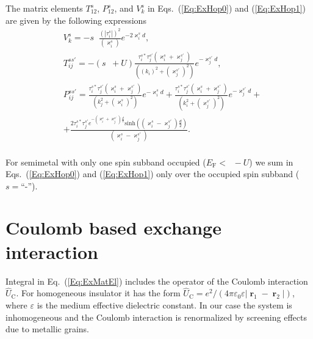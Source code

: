 \documentclass[aps,prb,amsmath,amssymb,twocolumn,superscriptaddress,showpacs,floatfix]{revtex4-1}
\DeclareMathOperator{\Ji}{\mathit J_{\mathrm{sd}}}
\DeclareMathOperator{\rv}{\mathbf r}
\begin{document}
The matrix elements $T^s_{12}$, $P^s_{12}$, and $V^s_{k}$ in Eqs.~(\ref{Eq:ExHop0}) and (\ref{Eq:ExHop1}) are given by the following expressions
\begin{equation}\label{Eq:ME7}
\begin{split}
&V^s_{k}=- s\!\Ji\frac{(|\tau^s_{i}|)^2}{(\varkappa_i^s)}e^{-2\varkappa_i^s d},\\
&T^{ss'}_{ij}\!=-(s\!\Ji+U)\frac{\tau^{s*}_{i}\tau^{s'}_{j}(\varkappa_i^{s}\!\!+\varkappa_j^{s'})}{(\!(k_i)^2+\!(\varkappa_j^{s'})^2)}e^{-\varkappa_j^{s'} \!d},\\
&P_{ij}^{ss'}=\frac{\tau^{s*}_{i}\tau^{s'}_{j}(\varkappa_i^{s}\!\!+\varkappa_j^{s'})}{(k_j^2+\!(\varkappa_i^{s})^2)}e^{-\varkappa_i^{s} \!d}+\frac{\tau^{s*}_{i}\tau^{s'}_{j}(\varkappa_i^{s}\!\!+\varkappa_j^{s'})}{(k_i^2+\!(\varkappa_j^{s'})^2)}e^{-\varkappa_j^{s'} \!d}+\\&+\frac{ 2\tau^{s*}_{i}\tau^{s'}_j e^{-(\!\varkappa^{s}_i+\varkappa^{s'}_j\!)\frac{d}{2}}\mathrm{sinh}(\!(\!\varkappa_i^{s}-\varkappa_j^{s'}\!)\frac{d}{2})}{(\varkappa_i^{s}-\varkappa_j^{s'})}.\\
\end{split}
\end{equation}


For semimetal with only one spin subband occupied ($E_\mathrm F<\Ji-U$) we sum in Eqs.~(\ref{Eq:ExHop0}) and (\ref{Eq:ExHop1})
only over the occupied spin subband ($s=$``-'').




\section{Coulomb based exchange interaction} \label{Sec:ExCoul}


Integral in Eq.~(\ref{Eq:ExMatEl}) includes the operator of the Coulomb interaction $\hat U_\mathrm C$. For homogeneous insulator it has the form $\hat U_{\mathrm{C}}=e^2/(4\pi\varepsilon_0\varepsilon |\rv_1-\rv_2|)$, where $\varepsilon$
is the medium effective dielectric constant. In our case the system is
inhomogeneous and the Coulomb interaction is renormalized by screening effects due
to metallic grains.
\end{document}

